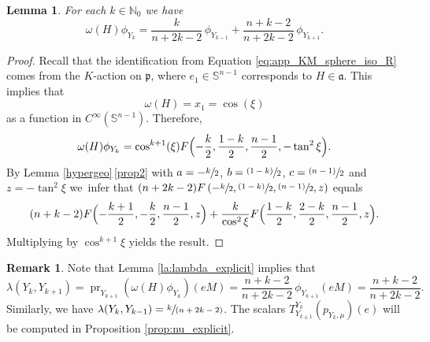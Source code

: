 \documentclass[JEP,XML,SOM,NoFloatCountersInSection,Unicode,published]{cedram}
\newcommand{\psfrac}[2]{\sfrac{(#1)}{#2}}
\newcommand{\spfrac}[2]{\sfrac{#1}{(#2)}}
\newtheorem{lemma}[theorem]{Lemma}
\theoremstyle{definition}
\newtheorem{remark}[theorem]{Remark}
\newcommand{\hyp}[4]{\ensuremath{F\left(#1,#2,#3,#4\right)}}
\newcommand{\Bhyp}[4]{\ensuremath{F\Bigl(#1,#2,#3,#4\Bigr)}}
\newcommand{\mb}[1]{\ensuremath{\mathbb{#1}}}
\newcommand{\mf}[1]{\ensuremath{\mathfrak{#1}}}
\newcommand{\on}[1]{\ensuremath{\operatorname{#1}}}
\newcommand{\N}{\ensuremath{\mathbb{N}}}
\begin{document}
\begin{lemma}\label{la:decomp_omega_R}
For each $k\in\N_0$ we have
\[
\omega(H)\phi_{Y_k}=\frac{k}{n+2k-2}\,\phi_{Y_{k-1}}+\frac{n+k-2}{n+2k-2}\,\phi_{Y_{k+1}}.
\]
\end{lemma}

\begin{proof}
Recall that the identification from Equation \eqref{eq:app_KM_sphere_iso_R} comes from the $K$-action on $\mf p$, where $e_1\in\mb S^{n-1}$ corresponds to $H\in\mf a$. This implies that
\[
\omega(H)=x_1=\cos(\xi)
\]
as a function in $C^\infty(\mb S^{n-1})$. Therefore,
\[
\omega(H)\phi_{Y_k}=\cos^{k+1}(\xi) \Bhyp{-\frac{k}{2}}{\frac{1-k}{2}}{\frac{n-1}{2}}{-\tan^2\xi}.
\]
By Lemma \ref{hypergeo}\,\eqref{prop2} with $a=-\sfrac{k}{2}$, $b=\psfrac{1-k}{2}$, $c=\psfrac{n-1}{2}$ and $z=-\tan^2\xi$ we~infer that $(n+2k-2)\hyp{-\sfrac{k}{2}}{\psfrac{1-k}{2}}{\psfrac{n-1}{2}}{z}$ equals
\[
(n+k-2)\Bhyp{-\frac{k+1}{2}}{-\frac{k}{2}}{\frac{n-1}{2}}{z}+\frac{k}{\cos^2\xi}\Bhyp{\frac{1-k}{2}}{\frac{2-k}{2}}{\frac{n-1}{2}}{z}.
\]
Multiplying by $\cos^{k+1}\xi$ yields the result.
\end{proof}

\begin{remark}\label{rem:lambda_R}
Note that Lemma \ref{la:lambda_explicit} implies that
\[
\lambda(Y_k,Y_{k+1})=\on{pr}_{Y_{k+1}}(\omega(H)\phi_{Y_k})(eM)=\frac{n+k-2}{n+2k-2}\,\phi_{Y_{k+1}}(eM)=\frac{n+k-2}{n+2k-2}.
\]
Similarly, we have $\lambda(Y_k,Y_{k-1})=\spfrac{k}{n+2k-2}$. The scalars $T_{Y_{k\pm 1}}^{Y_k}(p_{Y_k,\mu})(e)$ will be computed in Proposition \ref{prop:nu_explicit}.
\end{remark}
\end{document}
